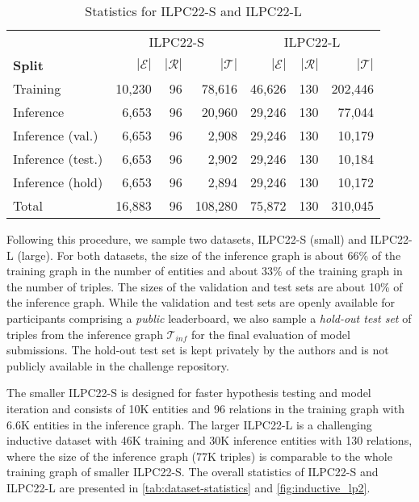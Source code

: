 \documentclass[sigconf,screen]{acmart}
\begin{document}
\begin{table}[]
    \centering
    \begin{tabular}{lrrr|rrr}
        \toprule
         & \multicolumn{3}{c}{ILPC22-S} & \multicolumn{3}{c}{ILPC22-L} \\
         \textbf{Split} & $|\mathcal{E}|$ & $|\mathcal{R}|$ & $|\mathcal{T}|$ & $|\mathcal{E}|$ & $|\mathcal{R}|$ & $|\mathcal{T}|$\\
         \midrule
         Training          & 10,230  & 96 & 78,616 & 46,626  & 130 & 202,446\\
         Inference         &  6,653  & 96 & 20,960 & 29,246  & 130 &  77,044\\
         Inference (val.)  &  6,653  & 96 &  2,908 & 29,246  & 130 &  10,179\\
         Inference (test.) &  6,653  & 96 &  2,902 & 29,246  & 130 &  10,184\\
         Inference (hold)  &  6,653  & 96 &  2,894 & 29,246  & 130 &  10,172\\
         \midrule
         Total & 16,883 & 96 & 108,280 & 75,872 & 130 & 310,045 \\
         \bottomrule
    \end{tabular}
    \caption{Statistics for ILPC22-S and ILPC22-L}
    \label{tab:dataset-statistics}
\end{table}

Following this procedure, we sample two datasets, ILPC22-S (small) and ILPC22-L (large). 
For both datasets, the size of the inference graph is about 66\% of the training graph in the number of entities and about 33\% of the training graph in the number of triples.
The sizes of the validation and test sets are about 10\% of the inference graph. 
While the validation and test sets are openly available for participants comprising a \emph{public} leaderboard, we also sample a \emph{hold-out test set} of triples from the inference graph $\mathcal{T}_{inf}$ for the final evaluation of model submissions. 
The hold-out test set is kept privately by the authors and is not publicly available in the challenge repository.

The smaller ILPC22-S is designed for faster hypothesis testing and model iteration and consists of 10K entities and 96 relations in the training graph with 6.6K entities in the inference graph.
The larger ILPC22-L is a challenging inductive dataset with 46K training and 30K inference entities with 130 relations, where the size of the inference graph (77K triples) is comparable to the whole training graph of smaller ILPC22-S. 
The overall statistics of ILPC22-S and ILPC22-L are presented in \autoref{tab:dataset-statistics} and \autoref{fig:inductive_lp2}.
\end{document}
